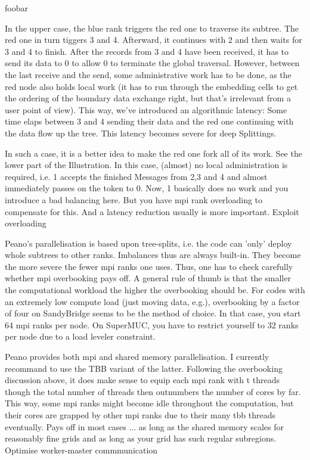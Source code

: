 foobar

In the upper case, the blue rank triggers the red one to traverse its subtree. The red one in turn tiggers 3 and 4. Afterward, it continues with 2 and then waits for 3 and 4 to finish. After the records from 3 and 4 have been received, it has to send its data to 0 to allow 0 to terminate the global traversal. However, between the last receive and the send, some administrative work has to be done, as the red node also holds local work (it has to run through the embedding cells to get the ordering of the boundary data exchange right, but that's irrelevant from a user point of view). This way, we've introduced an algorithmic latency: Some time elaps between 3 and 4 sending their data and the red one continuing with the data flow up the tree. This latency becomes severe for deep Splittings.

In such a case, it is a better idea to make the red one fork all of its work. See the lower part of the Illustration. In this case, (almost) no local administration is required, i.e. 1 accepts the finished Messages from 2,3 and 4 and almost immediately passes on the token to 0. Now, 1 basically does no work and you introduce a bad balancing here. But you have mpi rank overloading to compensate for this. And a latency reduction usually is more important.
Exploit overloading

Peano's parallelisation is based upon tree-splits, i.e. the code can 'only' deploy whole subtrees to other ranks. Imbalances thus are always built-in. They become the more severe the fewer mpi ranks one uses. Thus, one has to check carefully whether mpi overbooking pays off. A general rule of thumb is that the smaller the computational workload the higher the overbooking should be. For codes with an extremely low compute load (just moving data, e.g.), overbooking by a factor of four on SandyBridge seems to be the method of choice. In that case, you start 64 mpi ranks per node. On SuperMUC, you have to restrict yourself to 32 ranks per node due to a load leveler constraint.

Peano provides both mpi and shared memory parallelisation. I currently recommand to use the TBB variant of the latter. Following the overbooking discussion above, it does make sense to equip each mpi rank with t threads though the total number of threads then outnumbers the number of cores by far. This way, some mpi ranks might become idle throughout the computation, but their cores are grapped by other mpi ranks due to their many tbb threads eventually. Pays off in most cases ... as long as the shared memory scales for reasonably fine grids and as long as your grid has such regular subregions.
Optimise worker-master commmunication


